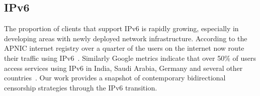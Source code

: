\subsection{IPv6} \label{sec:background:ipv6}

The proportion of clients that support IPv6 is rapidly growing, especially in
developing areas with newly deployed network infrastructure. According to the
APNIC internet registry over a quarter of the users on the internet now route
their traffic using IPv6~\cite{Huston-APNIC2021}. Similarly Google metrics
indicate that over 50\% of users access services using IPv6 in India, Saudi
Arabia, Germany and several other countries~\cite{Google-IPv6}. Our work
provides a snapshot of contemporary bidirectional censorship strategies through
the IPv6 transition.
